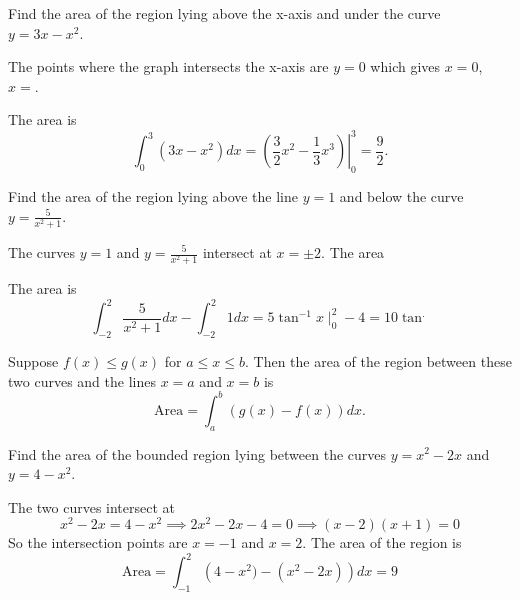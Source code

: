 \documentclass[../calc1-main.tex]{subfiles}
\begin{document}
\begin{example}
  Find the area of the region lying above the x-axis and under the curve $y=3x-x^2$.
\end{example}
\begin{minipage}{0.5\textwidth}
  \begin{solution}
    The points where the graph intersects the x-axis are $y=0$ which gives $x=0$, $x=$.

    The area is
    \[
      \int_0^3 (3x-x^2) dx = \left. \left( \frac{3}{2}x^2 - \frac{1}{3}x^3 \right) \right\vert_0^3 = \frac{9}{2}.
    \]
  \end{solution}
\end{minipage}%
\begin{minipage}{0.5\textwidth}
  \begin{figure}[H]
    \centering
    
  \end{figure}
\end{minipage}

\begin{example}
  Find the area of the region lying above the line $y=1$ and below the curve $y=\frac{5}{x^2+1}$.
\end{example}
\begin{minipage}{0.5\textwidth}
  \begin{solution}
    The curves $y=1$ and $y=\frac{5}{x^2+1}$ intersect at $x=\pm 2$. The area

    The area is
    \[
      \int_{-2}^2 \frac{5}{x^2+1} dx - \int_{-2}^2 1 dx = 5 \tan^{-1}x \mid_0^2 - 4 = 10\tan^.
    \]
  \end{solution}
\end{minipage}%
\begin{minipage}{0.5\textwidth}
  \begin{figure}[H]
    \centering
    
  \end{figure}
\end{minipage}

Suppose $f(x) \le g(x)$ for $a \le x \le b$. Then the area of the region between these two curves and the lines $x=a$ and $x=b$ is
\[
	\text{Area} = \int_a^b (g(x) - f(x)) dx.
\]
\begin{example}
	Find the area of the bounded region lying between the curves $y=x^2 - 2x$ and $y= 4-x^2$.
\end{example}

\begin{minipage}{0.5\textwidth}
	\begin{solution}
		The two curves intersect at
		\[
			x^2-2x = 4-x^2 \implies 2x^2 - 2x - 4 = 0 \implies (x-2)(x+1) = 0
		\]
		So the intersection points are $x=-1$ and $x=2$.
		The area of the region is
		\[
			\text{Area} = \int_{-1}^2 \left(4-x^2) - (x^2 - 2x)  \right) dx = 9
		\]

	\end{solution}
\end{minipage}%
\begin{minipage}{0.5\textwidth}
  \begin{figure}[H]
	\centering
	
\end{figure}
\end{minipage}
\end{document}
